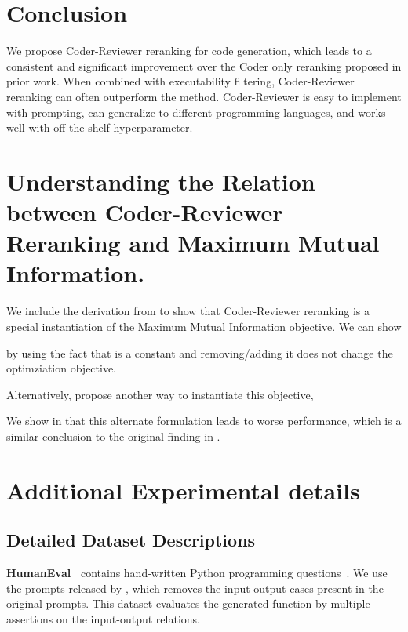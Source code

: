 \documentclass[nohyperref]{article}
\theoremstyle{plain}
\theoremstyle{definition}
\theoremstyle{remark}
\renewcommand{\paragraph}[1]{
     \textbf{#1} 
 }
\begin{document}
 \section{Conclusion}
We propose Coder-Reviewer reranking for code generation, which leads to a consistent and significant improvement over the Coder only reranking proposed in prior work.
When combined with executability filtering, Coder-Reviewer reranking can often outperform the \mbr{} method.
Coder-Reviewer is easy to implement with prompting, can generalize to different programming languages, and works well with off-the-shelf hyperparameter. 




\appendix
\section{Understanding the Relation between Coder-Reviewer
Reranking and Maximum Mutual Information.}
\label{sec:app-derivation}
We include the derivation from \citet{mmi-diversity} to show that Coder-Reviewer reranking is a special instantiation of the Maximum Mutual Information objective.
We can show

by using the fact that  is a constant and removing/adding it does not change the optimziation objective.
\label{sec:app-derivation}

Alternatively, \citet{mmi-diversity} propose another way to instantiate this objective,

We show in  that this alternate formulation leads to worse performance, which is a similar conclusion to the original finding in \citet{mmi-diversity}. \section{Additional Experimental details}
\subsection{Detailed Dataset Descriptions}
\label{sec:app-dataset-details}
\paragraph{HumanEval~\citep{codex}} contains  hand-written Python programming questions~\citet{codex}. We use the prompts released by \citet{codet}, which removes the input-output cases present in the original prompts. 
This dataset evaluates the generated function by multiple assertions on the input-output relations.
\end{document}
